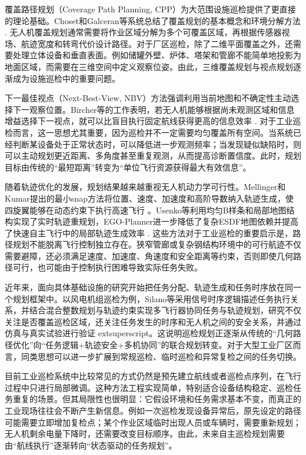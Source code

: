 覆盖路径规划（Coverage Path Planning, CPP）为大范围设施巡检提供了更直接的理论基础。Choset和Galceran等系统总结了覆盖规划的基本概念和环境分解方法
\cite{choset2001coverage,galceran2013survey}. 无人机覆盖规划通常需要将作业区域分解为多个可覆盖区域，再根据传感器视场、航迹宽度和转弯代价设计路径。对于厂区巡检，除了二维平面覆盖之外，还需要处理立体设备和垂直表面。例如储罐外壁、炉体、塔架和管廊不能简单地投影为地面区域，而需要在三维空间中定义观察位姿。由此，三维覆盖规划与视点规划逐渐成为设施巡检中的重要问题。

下一最佳视点（Next-Best-View, NBV）方法强调利用当前地图和不确定性主动选择下一观察位置。Bircher等的工作表明，若无人机能够根据尚未观测区域和信息增益选择下一视点，就可以比盲目执行固定航线获得更高的信息效率
\cite{bircher2016receding}. 对于工业巡检而言，这一思想尤其重要，因为巡检并不一定需要均匀覆盖所有空间。当系统已经判断某设备处于正常状态时，可以降低进一步观测频率；当发现疑似缺陷时，则可以主动规划更近距离、多角度甚至重复观测，从而提高诊断置信度。此时，规划目标由传统的“最短距离”转变为“单位飞行资源获得最大有效信息”。

随着轨迹优化的发展，规划结果越来越重视无人机动力学可行性。Mellinger和Kumar提出的最小snap方法将位置、速度、加速度和高阶导数纳入轨迹生成，使四旋翼能够在动态约束下执行高速飞行
\cite{mellinger2011minimum}。Usenko等利用均匀B样条和局部地图结构实现了实时轨迹重规划，EGO-Planner进一步降低了复杂ESDF地图依赖并提高了快速自主飞行中的局部轨迹生成效率
\cite{usenko2017real,zhou2022ego}. 这些方法对于工业巡检的重要启示是，路径规划不能脱离飞行控制独立存在。狭窄管廊或复杂钢结构环境中的可行航迹不仅需要避障，还必须满足速度、加速度、角速度和安全距离等约束，否则即使几何路径可行，也可能由于控制执行困难导致实际任务失败。

近年来，面向具体基础设施的研究开始把任务分配、轨迹生成和任务时序放在同一个规划框架中。以风电机组巡检为例，Silano等采用信号时序逻辑描述任务执行关系，并结合混合整数规划与轨迹约束实现多飞行器协同任务与轨迹规划，研究不仅关注是否覆盖巡检区域，还关注任务发生的时序和无人机之间的安全关系，并通过仿真与真实试验进行验证	extsuperscript{}。这说明巡检规划正逐渐从传统的“几何路径优化”向“任务逻辑+轨迹安全+多机协同”的联合规划转变。对于大型工业厂区而言，同类思想可以进一步扩展到常规巡检、临时巡检和异常复检之间的任务切换。

目前工业巡检系统中比较常见的方式仍然是预先建立航线或者巡检点序列，在飞行过程中只进行局部微调。这种方法工程实现简单，特别适合设备结构稳定、巡检任务重复的场景。但其局限性也很明显：它假设环境和任务需求基本不变，而真正的工业现场往往会不断产生新信息。例如一次巡检发现设备异常后，原先设定的路径可能需要立即增加复检点；某个作业区域临时出现人员或车辆时，需要重新规划；无人机剩余电量下降时，还需要改变目标顺序。由此，未来自主巡检规划需要由“航线执行”逐渐转向“状态驱动的任务规划”。

